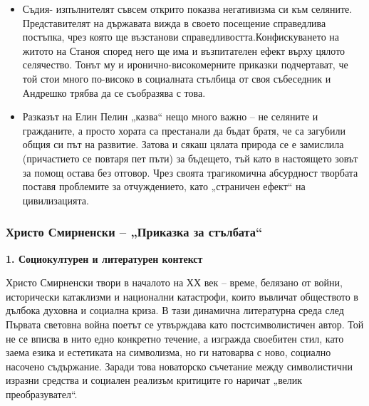 \documentclass[12pt,a4paper]{article}
\begin{document}
\begin{itemize}[leftmargin=*]
\vspace{-0.45cm}
\item Съдия- изпълнителят съвсем открито показва негативизма си към селяните. Представителят на държавата вижда в своето посещение справедлива постъпка, чрез която ще възстанови справедливостта.Конфискуването на житото на Станоя според него ще има и възпитателен ефект върху цялото селячество. Тонът му и иронично-високомерните приказки подчертават, че той стои много по-високо в социалната стълбица от своя събеседник и Андрешко трябва да се съобразява с това.
\end{itemize}

\begin{itemize}[leftmargin=*]
\vspace{-0.45cm}
\item Разказът на Елин Пелин „казва“ нещо много важно – не селяните и гражданите, а просто хората са престанали да бъдат братя, че са загубили общия си път на развитие. Затова и сякаш цялата природа се е замислила (причастието се повтаря пет пъти) за бъдещето, тъй като в настоящето зовът за помощ остава без отговор. Чрез своята трагикомична абсурдност творбата поставя проблемите за отчуждението, като „страничен ефект“ на цивилизацията.
\end{itemize}

\newpage

\subsubsection{\colorbox{green!40}{Христо Смирненски – „Приказка за стълбата“}}
\textbf{1. Социокултурен и литературен контекст}
\vspace{0.1cm}

\indent Христо Смирненски твори в началото на ХХ век – време, белязано от войни, исторически катаклизми и национални катастрофи, които въвличат обществото в дълбока духовна и социална криза. В тази динамична литературна среда след Първата световна война поетът се утвърждава като постсимволистичен автор. Той не се вписва в нито едно конкретно течение, а изгражда своебитен стил, като заема езика и естетиката на символизма, но ги натоварва с ново, социално насочено съдържание. Заради това новаторско съчетание между символистични изразни средства и социален реализъм критиците го наричат „велик преобразувател“.
\vspace{0.1cm}
\end{document}
